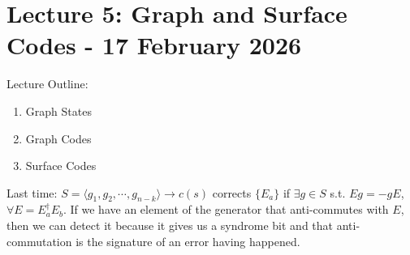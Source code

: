 \section{Lecture 5: Graph and Surface Codes - 17 February 2026}
Lecture Outline:
\begin{enumerate}[label=(\Roman*)]
    \item Graph States
    \item Graph Codes
    \item Surface Codes
\end{enumerate}

Last time: $S = \langle g_1, g_2, \cdots, g_{n-k} \rangle \rightarrow c(s)$ corrects $\{E_a\}$ if $\exists g \in S$ s.t. $Eg=-gE$, $\forall E = E_a^\dagger E_b$. If we have an element of the generator that anti-commutes with $E$, then we can detect it because it gives us a syndrome bit and that anti-commutation is the signature of an error having happened. 


